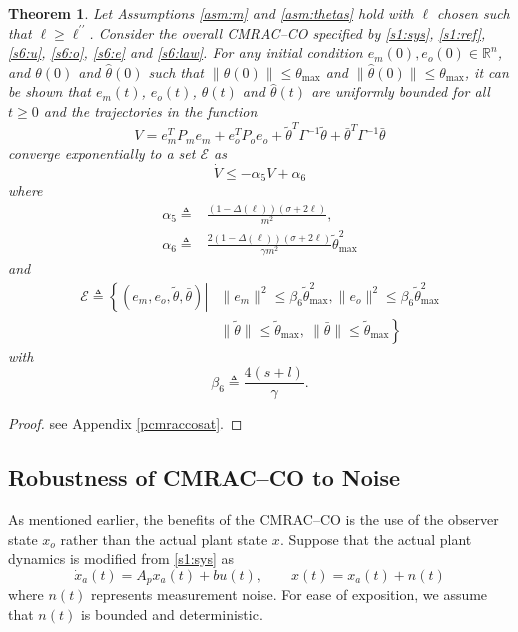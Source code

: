 \documentclass[10pt,journal]{IEEEtran}
\theoremstyle{plain}%
\newtheorem{thm}{Theorem}%
\theoremstyle{definition}
\newcommand{\be}[0]{\begin{equation}}
\newcommand{\ee}[0]{\end{equation}}
\newcommand{\ben}[0]{\begin{equation*}}
\newcommand{\een}[0]{\end{equation*}}
\newcommand{\norms}[1]{\lVert#1\rVert}
\newcommand{\normB}[0]{\norms}
\let\norm=\normB
\renewcommand{\Re}[0]{\mathbb R}
\begin{document}
\begin{thm}\label{cmraccosat} Let Assumptions \ref{asm:m} and \ref{asm:thetas} hold with $\ell$ chosen such that $\ell\geq \ell^{\prime\prime}$. Consider the overall CMRAC--CO specified by \eqref{s1:sys}, \eqref{s1:ref}, \eqref{s6:u},  \eqref{s6:o}, \eqref{s6:e} and \eqref{s6:law}. For any initial condition $e_m(0),e_o(0)\in \Re^n$, and $\theta(0)$ and $\hat\theta(0)$ such that $\norm{\theta(0)}\leq\theta_\text{max}$ and $\norm{\hat\theta(0)}\leq\theta_\text{max}$, it can be shown that $e_m(t)$, $e_o(t)$, $\theta(t)$ and $\hat\theta(t)$ are uniformly bounded for all $t\geq0$ and the trajectories in the function 
\be\label{s6:v}
V=   e_m^TP_m e_m + e_o^T P_o e_o + \tilde \theta^T\Gamma^{-1}\tilde\theta + \bar\theta^T \Gamma^{-1} \bar\theta
\ee 
converge exponentially to a set $\mathcal E$ as
\be
\dot V \leq -\alpha_5 V + \alpha_{6}
\ee
where
\be\begin{split}\label{s6:a}
\alpha_5 \triangleq& \frac{\left(1-\Delta(\ell) \right)\left(\sigma + 2 \ell \right)}{m^2}, \\ \alpha_{6} \triangleq&  \frac{2 \left(1-\Delta(\ell ) \right)\left(\sigma + 2 \ell\right)}{\gamma m^2} \tilde\theta_\text{max}^2
\end{split}\ee
and
\ben\begin{split}
\mathcal E \triangleq \left\{ (e_m,e_o,\tilde\theta,\bar\theta) \right | & \norm{e_m}^2  \leq \beta_6 \tilde\theta_\text{max}^2,  \norm{e_o}^2 \leq \beta_6  \tilde\theta_\text{max}^2 \\  & \left.  \norm {\tilde \theta} \leq \tilde\theta_\text{max},\ \norm {\bar \theta} \leq \tilde\theta_\text{max}\right\}
\end{split}\een
with 
\be\label{s6:b}
\beta_6 \triangleq \frac{4(s+l)}{\gamma}.
\ee
\end{thm}
\begin{proof}
see Appendix \ref{pcmraccosat}.
\end{proof}


\subsection{Robustness of CMRAC--CO to Noise }
As mentioned earlier, the benefits of the CMRAC--CO is the use of the observer state $x_o$ rather than the actual plant state $x$. Suppose that the actual plant dynamics is modified from \eqref{s1:sys} as
\be\label{p:n}
\dot x_a(t)= A_p x_a(t)+b u(t), \qquad x(t)=x_a(t)+n(t)
\ee
where $n(t)$ represents measurement noise. For ease of exposition, we assume that $n(t)$ is  bounded and deterministic.
\end{document}
